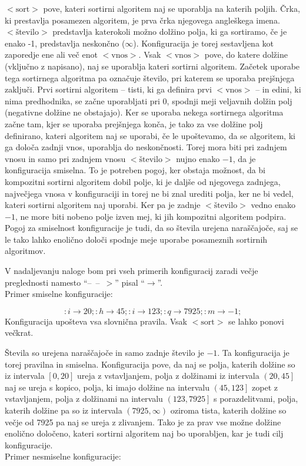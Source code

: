 \documentclass[a4paper,oneside]{article}
\newcommand{\ntm}[1]{\ensuremath{<\!\!\text{#1}\!\!>}}
\newcommand{\konfarrow}{\mbox{--}\ \mbox{--}\ \mbox{\ensuremath{>}}}
\newcommand{\lra}{\ensuremath{\longrightarrow}}
\begin{document}
\ntm{sort} pove, kateri sortirni algoritem naj se uporablja na katerih poljih. Črka, ki
prestavlja posamezen algoritem, je prva črka njegovega angleškega imena.
\ntm{število} predstavlja katerokoli možno dolžino polja, ki ga sortiramo, če je enako -1,
predstavlja neskončno ($\infty$).
Konfiguracija je torej sestavljena kot zaporedje ene ali več enot \ntm{vnos}. 
Vsak \ntm{vnos} pove, do katere dolžine (vključno z napisano), naj se uporablja kateri sortirni
algoritem. Začetek uporabe tega sortirnega algoritma pa označuje število, pri katerem se
uporaba prejšnjega zaključi. Prvi sortirni algoritem -- tisti, ki ga definira prvi
\ntm{vnos} -- in edini, ki nima predhodnika, se začne uporabljati pri 0, spodnji meji veljavnih dolžin
polj (negativne dolžine ne obstajajo). Ker se uporaba nekega sortirnega algoritma začne
tam, kjer se uporaba prejšnjega konča, je tako za vse dolžine polj definirano, kateri
algoritem naj se uporabi, če le upoštevamo, da se algoritem, ki ga določa zadnji vnos,
uporablja do neskončnosti. Torej mora biti pri zadnjem vnosu in samo pri zadnjem vnosu 
\ntm{število} nujno enako $-1$, da je konfiguracija smiselna. To je potreben pogoj, ker obstaja možnost, da bi
kompozitni sortirni algoritem dobil polje, ki je daljše od njegovega zadnjega, največjega
vnosa v konfiguraciji in torej ne bi znal urediti polja, ker ne bi vedel, kateri sortirni
algoritem naj uporabi. Ker pa je zadnje \ntm{število} vedno enako $-1$, ne more biti nobeno
polje izven mej, ki jih kompozitni algoritem podpira.
Pogoj za smiselnost konfiguracije je tudi, da so števila urejena naraščajoče, saj se le tako lahko
enolično določi spodnje meje uporabe posameznih sortirnih algoritmov. 

V nadaljevanju naloge bom pri vseh primerih konfiguracij zaradi večje preglednosti 
namesto ``\konfarrow'' pisal ``\lra''.
\\
Primer smiselne konfiguracije:

\[ :i \lra 20;:h \lra 45;:i \lra 123;:q \lra 7925;:m \lra -1; \]
Konfiguracija upošteva vsa slovnična pravila. Vsak \ntm{sort} se lahko ponovi večkrat.

Števila so urejena naraščajoče in samo zadnje število je $-1$. Ta konfiguracija je torej
pravilna in smiselna. Konfiguracija pove, da naj se polja, katerih dolžine so iz intervala $\left[0,
20\right]$ ureja z vstavljanjem, polja z dolžinami iz intervala $\left(20, 45\right]$ naj
se ureja s kopico, polja, ki imajo dolžine na intervalu $\left(45, 123\right]$ zopet z vstavljanjem,
polja z dolžinami na intervalu $\left(123, 7925\right]$ s porazdelitvami, polja, katerih dolžine pa so iz
intervala $\left(7925, \infty\right)$ oziroma tista, katerih dolžine so večje od 7925
pa naj se ureja z zlivanjem. Tako je za prav vse možne dolžine enolično določeno, kateri
sortirni algoritem naj bo uporabljen, kar je tudi cilj konfiguracije.
\\
Primer nesmiselne konfiguracije:
\end{document}

